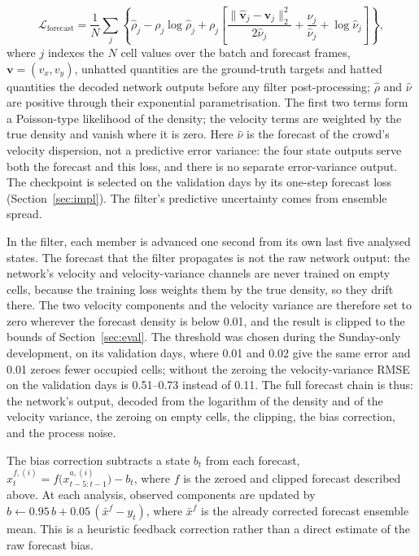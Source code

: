 \documentclass[english, 12pt, a4paper, elec, utf8, a-2b, online]{aaltothesis}
\begin{document}
\begin{equation}
	\mathcal{L}_{\mathrm{forecast}} = \frac{1}{N} \sum_j
	\left\{
	\hat{\rho}_j - \rho_j \log \hat{\rho}_j
	+ \rho_j \left[
	\frac{\|\hat{\boldsymbol{v}}_j - \boldsymbol{v}_j\|_2^2}{2\hat{\nu}_j}
	+ \frac{\nu_j}{\hat{\nu}_j} + \log \hat{\nu}_j
	\right]
	\right\},
	\label{eq:pedpred_loss}
\end{equation}
where $j$ indexes the $N$ cell values over the batch and forecast frames,
$\boldsymbol{v}=(v_x,v_y)$, unhatted quantities are the ground-truth targets and
hatted quantities the decoded network outputs before any filter
post-processing; $\hat{\rho}$ and $\hat{\nu}$ are positive through their
exponential parametrisation. The first two terms form a Poisson-type likelihood
of the density; the velocity terms are weighted by the true density and vanish
where it is zero. Here $\hat{\nu}$ is the forecast of the crowd's velocity
dispersion, not a predictive error variance: the four state outputs serve both
the forecast and this loss, and there is no separate error-variance output.
The checkpoint is selected on the validation days by its one-step forecast
loss (Section~\ref{sec:impl}).
The filter's predictive uncertainty comes from ensemble spread.

In the filter, each member is advanced one second from its own last five
analysed states. The forecast that the filter propagates is not the raw network
output: the network's velocity and velocity-variance channels are never trained
on empty cells, because the training loss weights them by the true density, so
they drift there. The two velocity components and the velocity variance are
therefore set to zero wherever the forecast density is below 0.01, and the
result is clipped to the bounds of Section~\ref{sec:eval}. The threshold was
chosen during the Sunday-only development, on its validation days, where 0.01
and 0.02 give the same error and 0.01
zeroes fewer occupied cells; without the zeroing the velocity-variance RMSE on
the validation days is 0.51--0.73 instead of 0.11. The full forecast chain is
thus: the network's output, decoded from the logarithm of the density and of the
velocity variance, the zeroing on empty cells, the clipping, the bias
correction, and the process noise.

The bias correction subtracts a state $b_t$ from each forecast,
$x^{f,(i)}_t = f\big(x^{a,(i)}_{t-5:t-1}\big) - b_t$, where $f$ is the zeroed and
clipped forecast described above. At each analysis,
observed components are updated by
$b \leftarrow 0.95\, b + 0.05\,(\bar{x}^f-y_t)$, where $\bar{x}^f$ is the
already corrected forecast ensemble mean. This is a heuristic feedback
correction rather than a direct estimate of the raw forecast bias.
\end{document}
